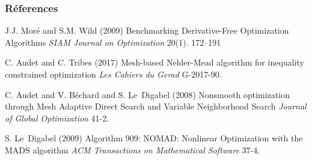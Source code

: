 \documentclass{beamer}
\begin{document}

\begin{frame}
\frametitle{Réferences}
\footnotesize{
	\begin{thebibliography}{99} %
		 J.J. Mor\'e and S.M. Wild (2009)
		\newblock   Benchmarking Derivative-Free Optimization Algorithms
		\newblock \emph{SIAM Journal on Optimization} 20(1). 172--191

		 C. Audet and C. Tribes (2017)
		\newblock Mesh-based Nelder-Mead algorithm for inequality constrained
		optimization
		\newblock \emph{Les Cahiers du Gerad} G-2017-90.
		
		C. Audet and V. B\'echard and S. {Le~Digabel} (2008)
		\newblock Nonsmooth optimization through Mesh Adaptive Direct Search
		and Variable Neighborhood Search
		\newblock \emph{Journal of Global Optimization} 41-2.
		
		 S. {Le~Digabel} (2009)
		\newblock Algorithm 909: NOMAD: Nonlinear Optimization with the MADS algorithm
		\newblock \emph{{ACM} Transactions on Mathematical Software} 37-4.
	\end{thebibliography}
}
\end{frame}
\end{document}
